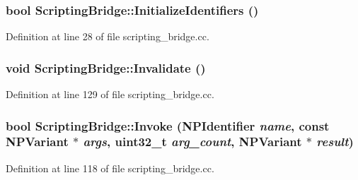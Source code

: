 \hypertarget{classtumbler_1_1_scripting_bridge_a05f2a65b751d12e6aeaa00bfd91ef83f}{
\subsubsection[{InitializeIdentifiers}]{\setlength{\rightskip}{0pt plus 5cm}bool ScriptingBridge::InitializeIdentifiers ()}}
\label{classtumbler_1_1_scripting_bridge_a05f2a65b751d12e6aeaa00bfd91ef83f}


Definition at line 28 of file scripting\_\-bridge.cc.

\hypertarget{classtumbler_1_1_scripting_bridge_af00ea5a26438b33f976734a3432dfa9b}{
\subsubsection[{Invalidate}]{\setlength{\rightskip}{0pt plus 5cm}void ScriptingBridge::Invalidate ()}}
\label{classtumbler_1_1_scripting_bridge_af00ea5a26438b33f976734a3432dfa9b}


Definition at line 129 of file scripting\_\-bridge.cc.

\hypertarget{classtumbler_1_1_scripting_bridge_ad18d2af321b2cba1235876cf281295df}{
\subsubsection[{Invoke}]{\setlength{\rightskip}{0pt plus 5cm}bool ScriptingBridge::Invoke (NPIdentifier {\em name}, \/  const NPVariant $\ast$ {\em args}, \/  uint32\_\-t {\em arg\_\-count}, \/  NPVariant $\ast$ {\em result})}}
\label{classtumbler_1_1_scripting_bridge_ad18d2af321b2cba1235876cf281295df}


Definition at line 118 of file scripting\_\-bridge.cc.

